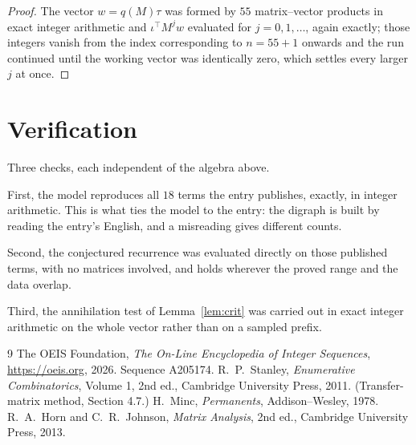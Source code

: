 \documentclass[11pt,a4paper]{article}
\theoremstyle{plain}
\theoremstyle{definition}
\begin{document}
\begin{proof}
The vector $w=q(M)\tau$ was formed by $55$ matrix--vector products in exact integer
arithmetic and $\iota^{\!\top}M^{j}w$ evaluated for $j=0,1,\dots$, again exactly; those
integers vanish from the index corresponding to $n=55+1$ onwards and the run continued
until the working vector was identically zero, which settles every larger $j$ at once.
\end{proof}

\section{Verification}

Three checks, each independent of the algebra above.

First, the model reproduces all $18$ terms the entry publishes, exactly, in integer
arithmetic. This is what ties the model to the entry: the digraph is built by reading the
entry's English, and a misreading gives different counts.

Second, the conjectured recurrence was evaluated directly on those published terms, with no
matrices involved, and holds wherever the proved range and the data overlap.

Third, the annihilation test of Lemma~\ref{lem:crit} was carried out in exact integer
arithmetic on the whole vector rather than on a sampled prefix.

\begin{thebibliography}{9}
 The OEIS Foundation, \emph{The On-Line Encyclopedia of Integer
Sequences}, \url{https://oeis.org}, 2026. Sequence A205174.
 R.~P.~Stanley, \emph{Enumerative Combinatorics}, Volume 1, 2nd ed.,
Cambridge University Press, 2011. (Transfer-matrix method, Section 4.7.)
 H.~Minc, \emph{Permanents}, Addison--Wesley, 1978.
 R.~A.~Horn and C.~R.~Johnson, \emph{Matrix Analysis}, 2nd ed., Cambridge
University Press, 2013.
\end{thebibliography}
\end{document}
